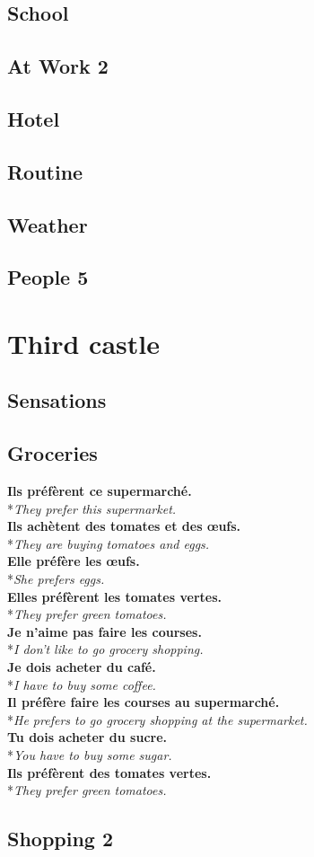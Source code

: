 \documentclass[a4paper,11pt,oneside]{book}
\newcommand{\phrase}[2]{\noindent\textbf{#1}\\*\-\hspace{0.5cm}\textit{#2}\\}
\begin{document}
\section{School}
\section{At Work 2}
\section{Hotel}
\section{Routine}
\section{Weather}
\section{People 5}

\chapter{Third castle}

\section{Sensations}
\section{Groceries}

\phrase{Ils préfèrent ce supermarché.}{They prefer this supermarket.}
\phrase{Ils achètent des tomates et des œufs.}{They are buying tomatoes and eggs.}
\phrase{Elle préfère les œufs.}{She prefers eggs.}
\phrase{Elles préfèrent les tomates vertes.}{They prefer green tomatoes.}
\phrase{Je n'aime pas faire les courses.}{I don't like to go grocery shopping.}
\phrase{Je dois acheter du café.}{I have to buy some coffee.}
\phrase{Il préfère faire les courses au supermarché.}{He prefers to go grocery shopping at the supermarket.}
\phrase{Tu dois acheter du sucre.}{You have to buy some sugar.}
\phrase{Ils préfèrent des tomates vertes.}{They prefer green tomatoes.}




\section{Shopping 2}
\end{document}

